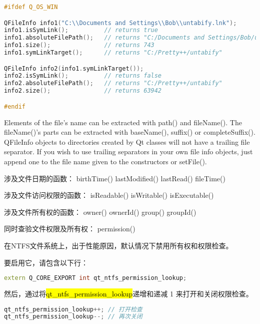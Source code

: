 \begin{lstlisting}[language=C++]
#ifdef Q_OS_WIN

QFileInfo info1("C:\\Documents and Settings\\Bob\\untabify.lnk");
info1.isSymLink();          // returns true
info1.absoluteFilePath();   // returns "C:/Documents and Settings/Bob/untabify.lnk"
info1.size();               // returns 743
info1.symLinkTarget();      // returns "C:/Pretty++/untabify"

QFileInfo info2(info1.symLinkTarget());
info2.isSymLink();          // returns false
info2.absoluteFilePath();   // returns "C:/Pretty++/untabify"
info2.size();               // returns 63942

#endif
\end{lstlisting}

Elements of the file's name can be extracted with path() and fileName(). The fileName()'s parts can be extracted with baseName(), suffix() or completeSuffix(). QFileInfo objects to directories created by Qt classes will not have a trailing file separator. If you wish to use trailing separators in your own file info objects, just append one to the file name given to the constructors or setFile().

涉及文件日期的函数： birthTime() lastModified() lastRead() fileTime()

涉及文件访问权限的函数： isReadable() isWritable() isExecutable()

涉及文件所有权的函数： owner() ownerId() group() groupId()

同时查验文件权限及所有权： permission()

\begin{notice}
在NTFS文件系统上，出于性能原因，默认情况下禁用所有权和权限检查。
\end{notice}


要启用它，请包含以下行：

\begin{lstlisting}[language=C++]
extern Q_CORE_EXPORT int qt_ntfs_permission_lookup;
\end{lstlisting}

然后，通过将\hl{qt\_ntfs\_permission\_lookup}递增和递减 1 来打开和关闭权限检查。

\begin{lstlisting}[language=C++]
qt_ntfs_permission_lookup++; // 打开检查
qt_ntfs_permission_lookup--; // 再次关闭
\end{lstlisting}

